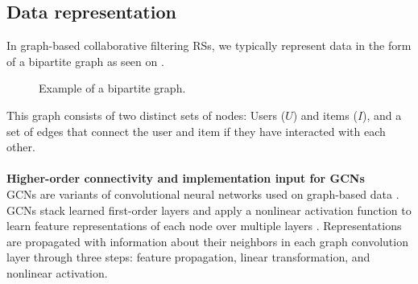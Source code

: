 \subsection{Data representation}
In graph-based collaborative filtering RSs, we typically represent data in the form of a bipartite graph as seen on .
\begin{figure}[h]
\caption{Example of a bipartite graph.}
\label{fig:bipartite-graph}
\end{figure}
This graph consists of two distinct sets of nodes: Users ($U$) and items ($I$), and a set of edges that connect the user and item if they have interacted with each other.\\\\
\textbf{Higher-order connectivity and implementation input for GCNs}
\\
GCNs are variants of convolutional neural networks used on graph-based data \cite{KOrderConnectivity}.
GCNs stack learned first-order layers and apply a nonlinear activation function to learn feature representations of each node over multiple layers \cite{KOrderConnectivity}.
Representations are propagated with information about their neighbors in each graph convolution layer through three steps: feature propagation, linear transformation, and nonlinear activation.

